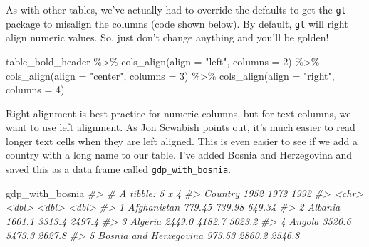 \documentclass[
]{book}
\newenvironment{Shaded}{\begin{snugshade}}{\end{snugshade}}
\newcommand{\AttributeTok}[1]{\textcolor[rgb]{0.77,0.63,0.00}{#1}}
\newcommand{\CommentTok}[1]{\textcolor[rgb]{0.56,0.35,0.01}{\textit{#1}}}
\newcommand{\DecValTok}[1]{\textcolor[rgb]{0.00,0.00,0.81}{#1}}
\newcommand{\FunctionTok}[1]{\textcolor[rgb]{0.00,0.00,0.00}{#1}}
\newcommand{\NormalTok}[1]{#1}
\newcommand{\SpecialCharTok}[1]{\textcolor[rgb]{0.00,0.00,0.00}{#1}}
\newcommand{\StringTok}[1]{\textcolor[rgb]{0.31,0.60,0.02}{#1}}
\begin{document}
As with other tables, we've actually had to override the defaults to get the \texttt{gt} package to misalign the columns (code shown below). By default, \texttt{gt} will right align numeric values. So, just don't change anything and you'll be golden!

\begin{Shaded}
\begin{Highlighting}[]
\NormalTok{table\_bold\_header }\SpecialCharTok{\%\textgreater{}\%} 
  \FunctionTok{cols\_align}\NormalTok{(}\AttributeTok{align =} \StringTok{"left"}\NormalTok{,}
             \AttributeTok{columns =} \DecValTok{2}\NormalTok{) }\SpecialCharTok{\%\textgreater{}\%} 
  \FunctionTok{cols\_align}\NormalTok{(}\AttributeTok{align =} \StringTok{"center"}\NormalTok{,}
             \AttributeTok{columns =} \DecValTok{3}\NormalTok{) }\SpecialCharTok{\%\textgreater{}\%} 
  \FunctionTok{cols\_align}\NormalTok{(}\AttributeTok{align =} \StringTok{"right"}\NormalTok{,}
             \AttributeTok{columns =} \DecValTok{4}\NormalTok{)}
\end{Highlighting}
\end{Shaded}

Right alignment is best practice for numeric columns, but for text columns, we want to use left alignment. As Jon Scwabish points out, it's much easier to read longer text cells when they are left aligned. This is even easier to see if we add a country with a long name to our table. I've added Bosnia and Herzegovina and saved this as a data frame called \texttt{gdp\_with\_bosnia}.

\begin{Shaded}
\begin{Highlighting}[]
\NormalTok{gdp\_with\_bosnia}
\CommentTok{\#\textgreater{} \# A tibble: 5 x 4}
\CommentTok{\#\textgreater{}   Country                 \textasciigrave{}1952\textasciigrave{}  \textasciigrave{}1972\textasciigrave{}  \textasciigrave{}1992\textasciigrave{}}
\CommentTok{\#\textgreater{}   \textless{}chr\textgreater{}                    \textless{}dbl\textgreater{}   \textless{}dbl\textgreater{}   \textless{}dbl\textgreater{}}
\CommentTok{\#\textgreater{} 1 Afghanistan             779.45  739.98  649.34}
\CommentTok{\#\textgreater{} 2 Albania                1601.1  3313.4  2497.4 }
\CommentTok{\#\textgreater{} 3 Algeria                2449.0  4182.7  5023.2 }
\CommentTok{\#\textgreater{} 4 Angola                 3520.6  5473.3  2627.8 }
\CommentTok{\#\textgreater{} 5 Bosnia and Herzegovina  973.53 2860.2  2546.8}
\end{Highlighting}
\end{Shaded}
\end{document}

